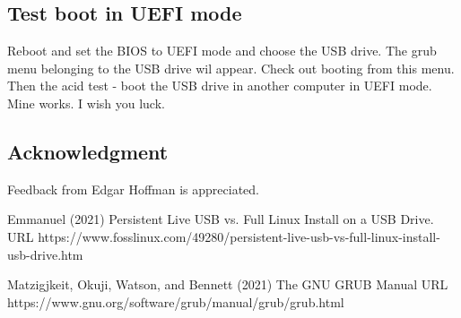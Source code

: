 \documentclass{article}  %
\begin{document}
\subsection{Test boot in UEFI mode}
Reboot and set the BIOS to UEFI mode and choose the USB drive.  The grub menu belonging to the USB drive wil appear. Check out booting from this menu. 
Then the acid test - boot the USB drive in another computer in UEFI mode. Mine works. I wish you luck.

\subsection{Acknowledgment}
Feedback from Edgar Hoffman is appreciated.

\begin{thebibliography}{99}

Emmanuel (2021) Persistent Live USB vs. Full Linux Install on a USB Drive. URL https://www.fosslinux.com/49280/persistent-live-usb-vs-full-linux-install-usb-drive.htm 

Matzigjkeit, Okuji, Watson, and Bennett (2021) The GNU GRUB Manual URL https://www.gnu.org/software/grub/manual/grub/grub.html

\end{thebibliography}
\end{document}
